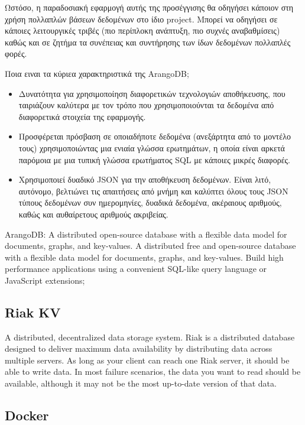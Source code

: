 \documentclass[conference]{IEEEtran}
\begin{document}
Ωστόσο, η παραδοσιακή εφαρμογή αυτής της προσέγγισης θα οδηγήσει κάποιον στη χρήση πολλαπλών βάσεων δεδομένων στο ίδιο project. Μπορεί να οδηγήσει σε κάποιες λειτουργικές τριβές (πιο περίπλοκη ανάπτυξη, πιο συχνές αναβαθμίσεις) καθώς και σε ζητήμα τα συνέπειας και συντήρησης των ίδων δεδομένων πολλαπλές φορές.

Ποια ειναι τα κύριεα χαρακτηριστικά της ArangoDB;
\begin{itemize}
    \item 
    Δυνατότητα για χρησιμοποίηση διαφορετικών τεχνολογιών αποθήκευσης, που ταιριάζουν καλύτερα με τον τρόπο που χρησιμοποιούνται τα δεδομένα από διαφορετικά στοιχεία της εφαρμογής.
    
    \item 
    Προσφέρεται πρόσβαση σε οποιαδήποτε δεδομένα (ανεξάρτητα από το μοντέλο τους) χρησιμοποιώντας μια ενιαία γλώσσα ερωτημάτων, η οποία είναι αρκετά παρόμοια με μια τυπική γλώσσα ερωτήματος SQL με κάποιες μικρές διαφορές.

    \item 
    Χρησιμοποιεί δυαδικό JSON για την αποθήκευση δεδομένων. Είναι λιτό, αυτόνομο, βελτιώνει τις απαιτήσεις από μνήμη και καλύπτει όλους τους JSON τύπους δεδομένων συν ημερομηνίες, δυαδικά δεδομένα, ακέραιους αριθμούς, καθώς και αυθαίρετους αριθμούς ακριβείας.
\end{itemize}

ArangoDB: A distributed open-source database with a flexible data model for documents, graphs, and key-values. A distributed free and open-source database with a flexible data model for documents, graphs, and key-values. Build high performance applications using a convenient SQL-like query language or JavaScript extensions;

\subsection{Riak KV}
 A distributed, decentralized data storage system. Riak is a distributed database designed to deliver maximum data availability by distributing data across multiple servers. As long as your client can reach one Riak server, it should be able to write data. In most failure scenarios, the data you want to read should be available, although it may not be the most up-to-date version of that data.

\subsection{Docker}
\end{document}
